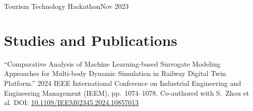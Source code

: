 \documentclass{ExpressiveResume}
\begin{document}
{Tourism Technology Hackathon}{Nov 2023}{}
{
}

\section{Studies and Publications}
{
\noindent ``Comparative Analysis of Machine Learning-based Surrogate Modeling Approaches for Multi-body Dynamic Simulation in Railway Digital Twin Platform.'' 2024 IEEE International Conference on Industrial Engineering and Engineering Management (IEEM), pp.~1074--1078. Co-authored with S.~Zhou et al. DOI: \href{https://doi.org/10.1109/IEEM62345.2024.10857013}{10.1109/IEEM62345.2024.10857013}
}



\end{document}
